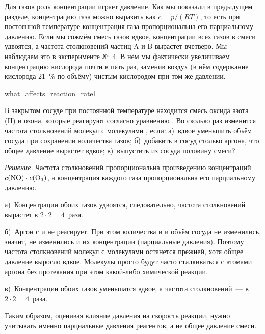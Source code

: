 Для газов роль концентрации играет давление. Как мы показали в предыдущем разделе, концентрацию газа можно выразить как $c = p/(RT)$, то есть при постоянной температуре концентрация газа пропорциональна его парциальному давлению. Если мы сожмём смесь газов вдвое, концентрации всех газов в смеси удвоятся, а частота столкновений частиц A и B вырастет вчетверо. Мы наблюдаем это в эксперименте №~4. В нём мы фактически увеличиваем концентрацию кислорода почти в пять раз, заменив воздух (в нём содержание кислорода \qty{21}{\percent} по объёму) чистым кислородом при том же давлении.

\begin{example}{}{what_affects_reaction_rate1}
    \begin{condition}
        В закрытом сосуде при постоянной температуре находится смесь оксида азота (II) и озона, которые реагируют согласно уравнению . Во сколько раз изменится частота столкновений молекул  с молекулами , если: а)~вдвое уменьшить объём сосуда при сохранении количества газов; б)~добавить в сосуд столько аргона, что общее давление вырастет вдвое; в)~выпустить из сосуда половину смеси?
    \end{condition}

    \medskip

    \textit{Решение.} Частота столкновений пропорциональна произведению концентраций $c(\ce{NO}) \cdot c(\ce{O3})$, а концентрация каждого газа пропорциональна его парциальному давлению.

    \medskip

    а)~Концентрации обоих газов удвоятся, следовательно, частота столкновений вырастет в $2 \cdot 2 = 4$~раза.

    \medskip

    б)~Аргон с  и  не реагирует. При этом количества  и  и объём сосуда не изменились, значит, не изменились и их концентрации (парциальные давления). Поэтому частота столкновений молекул  с молекулами  останется прежней, хотя общее давление выросло вдвое. Молекулы просто будут часто сталкиваться с атомами аргона без протекания при этом какой-либо химической реакции.

    \medskip

    в)~Концентрации обоих газов уменьшатся вдвое, а частота столкновений~--- в $2 \cdot 2 = 4$~раза.

    \medskip

    Таким образом, оценивая влияние давления на скорость реакции, нужно учитывать именно парциальные давления реагентов, а не общее давление смеси.
\end{example}

